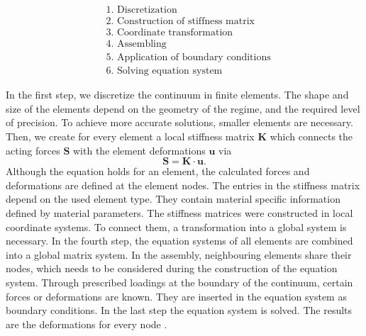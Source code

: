 \begin{align*}
    &\text{1. Discretization} \\
    &\text{2. Construction of stiffness matrix}\\ 
    &\text{3. Coordinate transformation} \\
    &\text{4. Assembling} \\
    &\text{5. Application of boundary conditions} \\
    &\text{6. Solving equation system}
\end{align*}

In the first step, we discretize the continuum in finite elements. The shape and size of the elements depend on the geometry of the regime, and the required level of precision. To achieve more accurate solutions, smaller elements are necessary. Then, we create for every element a local stiffness matrix $\boldsymbol{K}$ which connects the acting forces $\boldsymbol{S}$ with the element deformations $\boldsymbol{u}$ via 
\begin{equation}
    \boldsymbol{S} =  \boldsymbol{K} \cdot \boldsymbol{u}.
\end{equation}
Although the equation holds for an element, the calculated forces and deformations are defined at the element nodes. The entries in the stiffness matrix depend on the used element type. They contain material specific information defined by material parameters. The stiffness matrices were constructed in local coordinate systems. To connect them, a transformation into a global system is necessary. In the fourth step, the equation systems of all elements are combined into a global matrix system. In the assembly, neighbouring elements share their nodes, which needs to be considered during the construction of the equation system. Through prescribed loadings at the boundary of the continuum, certain forces or deformations are known. They are inserted in the equation system as boundary conditions. In the last step the equation system is solved. The results are the deformations for every node \cite{willner_vorlesungsskript_nodate}\cite{jagota_finite_nodate}. \\

